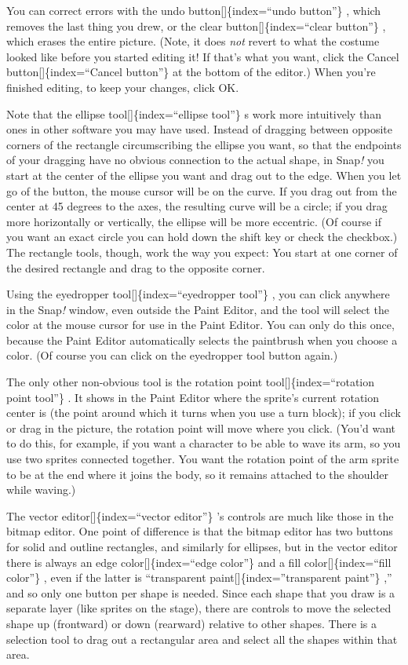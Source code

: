 \documentclass[
  letterpaper,
]{book}
\begin{document}
You can correct errors with the undo button{[}{]}\{index=``undo
button''\} , which removes the last thing you drew, or the clear
button{[}{]}\{index=``clear button''\} , which erases the entire
picture. (Note, it does \emph{not} revert to what the costume looked
like before you started editing it! If that's what you want, click the
Cancel button{[}{]}\{index=``Cancel button''\} at the bottom of the
editor.) When you're finished editing, to keep your changes, click OK.

Note that the ellipse tool{[}{]}\{index=``ellipse tool''\} s work more
intuitively than ones in other software you may have used. Instead of
dragging between opposite corners of the rectangle circumscribing the
ellipse you want, so that the endpoints of your dragging have no obvious
connection to the actual shape, in Snap\emph{!} you start at the center
of the ellipse you want and drag out to the edge. When you let go of the
button, the mouse cursor will be on the curve. If you drag out from the
center at 45 degrees to the axes, the resulting curve will be a circle;
if you drag more horizontally or vertically, the ellipse will be more
eccentric. (Of course if you want an exact circle you can hold down the
shift key or check the checkbox.) The rectangle tools, though, work the
way you expect: You start at one corner of the desired rectangle and
drag to the opposite corner.

Using the eyedropper tool{[}{]}\{index=``eyedropper tool''\} , you can
click anywhere in the Snap\emph{!} window, even outside the Paint
Editor, and the tool will select the color at the mouse cursor for use
in the Paint Editor. You can only do this once, because the Paint Editor
automatically selects the paintbrush when you choose a color. (Of course
you can click on the eyedropper tool button again.)

The only other non-obvious tool is the rotation point
tool{[}{]}\{index=``rotation point tool''\} . It shows in the Paint
Editor where the sprite's current rotation center is (the point around
which it turns when you use a turn block); if you click or drag in the
picture, the rotation point will move where you click. (You'd want to do
this, for example, if you want a character to be able to wave its arm,
so you use two sprites connected together. You want the rotation point
of the arm sprite to be at the end where it joins the body, so it
remains attached to the shoulder while waving.)

The vector editor{[}{]}\{index=``vector editor''\} 's controls are much
like those in the bitmap editor. One point of difference is that the
bitmap editor has two buttons for solid and outline rectangles, and
similarly for ellipses, but in the vector editor there is always an edge
color{[}{]}\{index=``edge color''\} and a fill color{[}{]}\{index=``fill
color''\} , even if the latter is ``transparent
paint{[}{]}\{index=''transparent paint''\} ,'' and so only one button
per shape is needed. Since each shape that you draw is a separate layer
(like sprites on the stage), there are controls to move the selected
shape up (frontward) or down (rearward) relative to other shapes. There
is a selection tool to drag out a rectangular area and select all the
shapes within that area.
\end{document}
